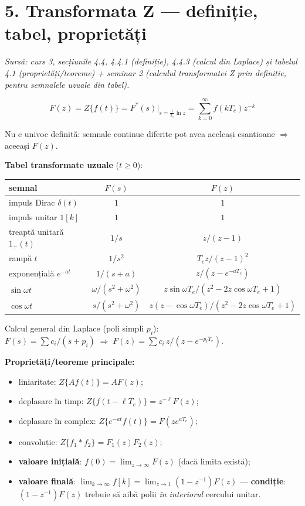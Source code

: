 \documentclass[10pt,a4paper]{article}
\newcommand{\srcnote}[1]{{\footnotesize\color{gray!55!black}\textit{Sursă: #1}}\par}
\begin{document}
\section*{5. Transformata Z — definiție, tabel, proprietăți}\label{sec:5}
\srcnote{curs 3, secțiunile 4.4, 4.4.1 (definiție), 4.4.3 (calcul din Laplace) și tabelul 4.1 (proprietăți/teoreme) + seminar 2 (calculul transformatei Z prin definiție, pentru semnalele uzuale din tabel).}
\begin{keyeq}\color{red!65!black}
$$F(z)=Z\{f(t)\}=F^*(s)\big|_{s=\frac{1}{T_e}\ln z}=\sum_{k=0}^{\infty}f(kT_e)z^{-k}$$
\end{keyeq}
Nu e univoc definită: semnale continue diferite pot avea aceleași eșantioane $\Rightarrow$ aceeași $F(z)$.

\textbf{Tabel transformate uzuale} ($t\ge0$):
\begin{center}\small
\begin{tabular}{l|c|c}
semnal & $F(s)$ & $F(z)$\\\hline
impuls Dirac $\delta(t)$ & $1$ & $1$\\
impuls unitar $1[k]$ & $1$ & $1$\\
treaptă unitară $1_+(t)$ & $1/s$ & $z/(z-1)$\\
rampă $t$ & $1/s^2$ & $T_ez/(z-1)^2$\\
exponențială $e^{-at}$ & $1/(s+a)$ & $z/(z-e^{-aT_e})$\\
$\sin\omega t$ & $\omega/(s^2{+}\omega^2)$ & $z\sin\omega T_e/(z^2{-}2z\cos\omega T_e{+}1)$\\
$\cos\omega t$ & $s/(s^2{+}\omega^2)$ & $z(z-\cos\omega T_e)/(z^2{-}2z\cos\omega T_e{+}1)$\\
\end{tabular}
\end{center}
Calcul general din Laplace (poli simpli $p_i$): $F(s)=\sum c_i/(s+p_i) \;\Rightarrow\; F(z)=\sum c_i\,z/(z-e^{-p_iT_e})$.

\textbf{Proprietăți/teoreme principale:}
\begin{itemize}
\item liniaritate: $Z\{Af(t)\}=AF(z)$;
\item deplasare în timp: $Z\{f(t-\ell T_e)\}=z^{-\ell}F(z)$;
\item deplasare în complex: $Z\{e^{-at}f(t)\}=F(ze^{aT_e})$;
\item convoluție: $Z\{f_1*f_2\}=F_1(z)F_2(z)$;
\item \textbf{valoare inițială}: $f(0)=\lim_{z\to\infty}F(z)$ (dacă limita există);
\item \textbf{valoare finală}: $\lim_{k\to\infty}f[k]=\lim_{z\to1}(1-z^{-1})F(z)$ — \textbf{condiție}: $(1-z^{-1})F(z)$ trebuie să aibă polii \emph{în interiorul} cercului unitar.
\end{itemize}
\end{document}
